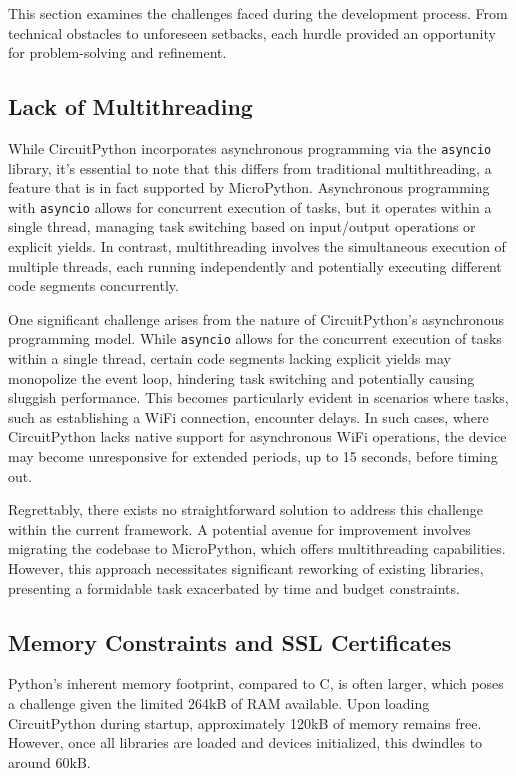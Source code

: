 This section examines the challenges faced during the development process. From technical obstacles 
to unforeseen setbacks, each hurdle provided an opportunity for problem-solving and refinement.

\subsection{Lack of Multithreading}

While CircuitPython incorporates asynchronous programming via the \texttt{asyncio} library, it's 
essential to note that this differs from traditional multithreading, a feature that is in fact 
supported by MicroPython. Asynchronous programming with \texttt{asyncio} allows for concurrent 
execution of tasks, but it operates within a single thread, managing task switching based on 
input/output operations or explicit yields. In contrast, multithreading involves the simultaneous 
execution of multiple threads, each running independently and potentially executing different code 
segments concurrently.

One significant challenge arises from the nature of CircuitPython's asynchronous programming model. 
While \texttt{asyncio} allows for the concurrent execution of tasks within a single thread, certain 
code segments lacking explicit yields may monopolize the event loop, hindering task switching and 
potentially causing sluggish performance. This becomes particularly evident in scenarios where 
tasks, such as establishing a WiFi connection, encounter delays. In such cases, where CircuitPython 
lacks native support for asynchronous WiFi operations, the device may become unresponsive for 
extended periods, up to 15 seconds, before timing out.

Regrettably, there exists no straightforward solution to address this challenge within the current 
framework. A potential avenue for improvement involves migrating the codebase to MicroPython, which 
offers multithreading capabilities. However, this approach necessitates significant reworking of 
existing libraries, presenting a formidable task exacerbated by time and budget constraints.

\subsection{Memory Constraints and SSL Certificates}

Python's inherent memory footprint, compared to C, is often larger, which poses a challenge given 
the limited 264kB of RAM available. Upon loading CircuitPython during startup, approximately 120kB 
of memory remains free. However, once all libraries are loaded and devices initialized, this 
dwindles to around 60kB.

